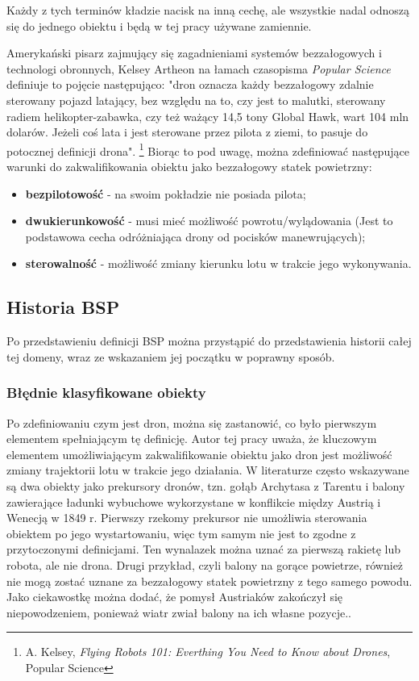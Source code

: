 Każdy z tych terminów kładzie nacisk na inną cechę, ale wszystkie nadal odnoszą się do jednego obiektu i będą w tej pracy używane zamiennie. 

Amerykański pisarz zajmujący się zagadnieniami systemów bezzałogowych i technologi obronnych,  Kelsey Artheon na łamach czasopisma \textit{Popular Science} definiuje to pojęcie następująco: "dron oznacza każdy bezzałogowy zdalnie sterowany pojazd latający, bez względu na to, czy jest to malutki, sterowany radiem helikopter-zabawka, czy też ważący 14,5 tony Global Hawk, wart 104 mln dolarów. Jeżeli coś lata i jest sterowane przez pilota z ziemi, to pasuje do potocznej definicji drona". \footnote{A. Kelsey, \textit{Flying Robots 101: Everthing You Need to Know about Drones}, Popular Science\cite{arton-kelsey}} Biorąc to pod uwagę, można zdefiniować następujące warunki do zakwalifikowania obiektu jako bezzałogowy statek powietrzny:
\begin{itemize}
  \item \textbf{bezpilotowość} - na swoim pokładzie nie posiada pilota;
  \item \textbf{dwukierunkowość} - musi mieć możliwość powrotu/wylądowania (Jest to podstawowa cecha odróżniająca drony od pocisków manewrujących); 
  \item \textbf{sterowalność} - możliwość zmiany kierunku lotu w trakcie jego wykonywania.\cite{dron-ibuk}\cite{arton-kelsey}
\end{itemize}

\subsection{Historia BSP}
Po przedstawieniu definicji BSP można przystąpić do przedstawienia historii całej tej domeny, wraz ze wskazaniem jej początku w poprawny sposób.

\subsubsection{Błędnie klasyfikowane obiekty}
Po zdefiniowaniu czym jest dron, można się zastanowić, co było pierwszym elementem spełniającym tę definicję. Autor tej pracy uważa, że kluczowym elementem umożliwiającym zakwalifikowanie obiektu jako dron jest możliwość zmiany trajektorii lotu w trakcie jego działania. W literaturze często wskazywane są dwa obiekty jako prekursory dronów, tzn. gołąb Archytasa z Tarentu i balony zawierające ładunki wybuchowe wykorzystane w konflikcie między Austrią i Wenecją w 1849 r. Pierwszy rzekomy prekursor nie umożliwia sterowania obiektem po jego wystartowaniu, więc tym samym nie jest to zgodne z przytoczonymi definicjami. Ten wynalazek można uznać za pierwszą rakietę lub robota, ale nie drona. Drugi przykład, czyli balony na gorące powietrze, również nie mogą zostać uznane za bezzałogowy statek powietrzny z tego samego powodu. Jako ciekawostkę można dodać, że pomysł Austriaków zakończył się niepowodzeniem, ponieważ wiatr zwiał balony na ich własne pozycje.\cite{dron-ibuk}. 


